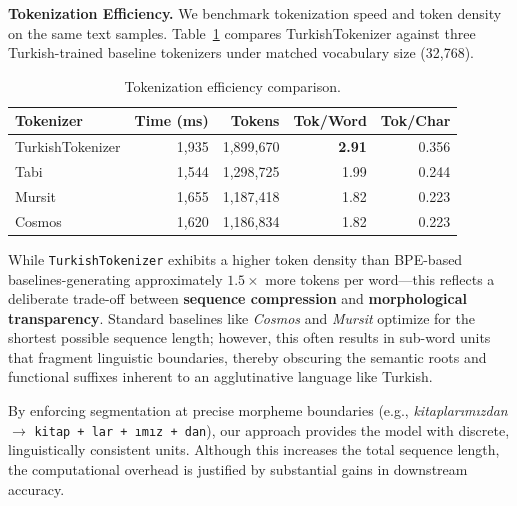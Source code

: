 \textbf{Tokenization Efficiency.} We benchmark tokenization speed and token density on the same text samples. Table~\ref{tab:tokenization_efficiency} compares TurkishTokenizer against three Turkish-trained baseline tokenizers under matched vocabulary size (32,768).

\begin{table}[H]
\centering
\caption{Tokenization efficiency comparison.}
\label{tab:tokenization_efficiency}
\begin{tabular}{lrrrr}
\toprule
\textbf{Tokenizer} & \textbf{Time (ms)} & \textbf{Tokens} & \textbf{Tok/Word} & \textbf{Tok/Char} \\
\midrule
TurkishTokenizer & 1,935 & 1,899,670 & \textbf{2.91} & 0.356 \\
Tabi & 1,544 & 1,298,725 & 1.99 & 0.244 \\
Mursit & 1,655 & 1,187,418 & 1.82 & 0.223 \\
Cosmos & 1,620 & 1,186,834 & 1.82 & 0.223 \\
\bottomrule
\end{tabular}
\end{table}

While \texttt{TurkishTokenizer} exhibits a higher token density than BPE-based baselines-generating approximately $1.5\times$ more tokens per word—this reflects a deliberate trade-off between \textbf{sequence compression} and \textbf{morphological transparency}. Standard baselines like \textit{Cosmos} and \textit{Mursit} optimize for the shortest possible sequence length; however, this often results in sub-word units that fragment linguistic boundaries, thereby obscuring the semantic roots and functional suffixes inherent to an agglutinative language like Turkish.

By enforcing segmentation at precise morpheme boundaries (e.g., \textit{kitaplarımızdan} $\rightarrow$ \texttt{kitap + lar + ımız + dan}), our approach provides the model with discrete, linguistically consistent units. Although this increases the total sequence length, the computational overhead is justified by substantial gains in downstream accuracy.
